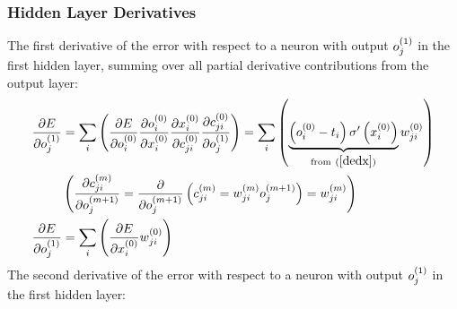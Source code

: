 \subsubsection{Hidden Layer Derivatives}
The first derivative of the error with respect to a neuron with output $o_{j}^{(1)}$ in the first hidden layer, summing over all partial derivative contributions from the output layer:
\begin{align}
\pdv{E}{o_{j}^{(1)}} &= 
\sum_i\left(
\pdv{E}{o_{i}^{(0)}}
\pdv{o_{i}^{(0)}}{x_{i}^{(0)}}
\pdv{x_{i}^{(0)}}{c_{ji}^{(0)}}
\pdv{c_{ji}^{(0)}}{o_{j}^{(1)}}
\right)
= 
\sum_i\left(
\underbrace{\left(o_{i}^{(0)} - t_{i}\right)\sigma^{\prime}\left(x_{i}^{(0)}\right)}
_{\text{from} \ (\ref{dedx})}
w_{ji}^{(0)}
\right)
\\
&\left(\pdv{{c_{ji}^{(m)}}}{{o_{j}^{(m+1)}}} = \pdv{}{{o_{j}^{(m+1)}}}\left(c_{ji}^{(m)} = w_{ji}^{(m)}o_{j}^{(m+1)}\right) = w_{ji}^{(m)}\right)\label{dcdo}
\\
\pdv{E}{o_{j}^{(1)}} &= \sum_i\left(\pdv{E}{x_{i}^{(0)}}w_{ji}^{(0)}\right)
\end{align}
The second derivative of the error with respect to a neuron with output $o_{j}^{(1)}$ in the first hidden layer:
